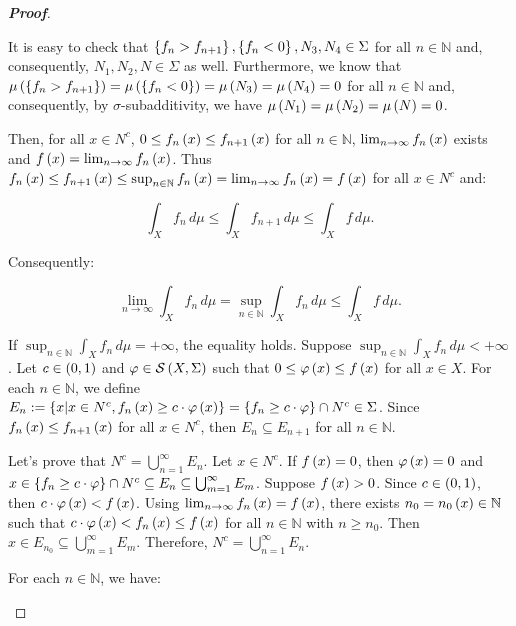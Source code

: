 \begin{theorem}
\begin{proof}[\rm\textbf{Proof}]
\begin{enumerate}
      It is easy to check that $\left\{f_n>f_{n+1}\right\},\left\{f_n<0\right\},N_3,N_4\in\Sigma$ for all $n\in\mathbb{N}$ and, consequently, $N_1,N_2,N\in\Sigma$ as well. Furthermore, we know that $\mu\left(\left\{f_n>f_{n+1}\right\}\right)=\mu\left(\left\{f_n<0\right\}\right)=\mu\left(N_3\right)=\mu\left(N_4\right)=0$ for all $n\in\mathbb{N}$ and, consequently, by $\sigma$-subadditivity, we have $\mu\left(N_1\right)=\mu\left(N_2\right)=\mu\left(N\right)=0$.

      Then, for all $x\in N^c$, $0\leq f_n\left(x\right)\leq f_{n+1}\left(x\right)$ for all $n\in\mathbb{N}$, $\lim_{n\to\infty}{f_n\left(x\right)}$ exists and $f\left(x\right)=\lim_{n\to\infty}{f_n\left(x\right)}$. Thus $f_n\left(x\right)\leq f_{n+1}\left(x\right)\leq\sup_{n\in\mathbb{N}}{f_n\left(x\right)}=\lim_{n\to\infty}{f_n\left(x\right)}=f\left(x\right)$ for all $x\in N^c$ and:

      \begin{equation}
        \int_{X}{f_n\,d\mu}\leq\int_{X}{f_{n+1}\,d\mu}\leq\int_{X}{f\,d\mu}.
      \end{equation}

      Consequently:

      \begin{equation}
        \lim_{n\to\infty}{\int_{X}{f_n\,d\mu}}=\sup_{n\in\mathbb{N}}{\int_{X}{f_n\,d\mu}}\leq\int_{X}{f\,d\mu}.
      \end{equation}

      If $\sup_{n\in\mathbb{N}}{\int_{X}{f_n\,d\mu}}=+\infty$, the equality holds. Suppose $\sup_{n\in\mathbb{N}}{\int_{X}{f_n\,d\mu}}<+\infty$. Let $c\in\left(0,1\right)$ and $\varphi\in\mathcal{S}\left(X,\Sigma\right)$ such that $0\leq\varphi\left(x\right)\leq f\left(x\right)$ for all $x\in X$. For each $n\in\mathbb{N}$, we define $E_n:=\left\{x\middle|x\in N^c,f_n\left(x\right)\geq c\cdot\varphi\left(x\right)\right\}=\left\{f_n\geq c\cdot\varphi\right\}\cap N^c\in\Sigma$. Since $f_n\left(x\right)\leq f_{n+1}\left(x\right)$ for all $x\in N^c$, then $E_n\subseteq E_{n+1}$ for all $n\in\mathbb{N}$. 

      Let's prove that $N^c=\bigcup_{n=1}^{\infty}{E_n}$. Let $x\in N^c$. If $f\left(x\right)=0$, then $\varphi\left(x\right)=0$ and $x\in\left\{f_n\geq c\cdot\varphi\right\}\cap N^c\subseteq E_n\subseteq\bigcup_{m=1}^{\infty}{E_m}$. Suppose $f\left(x\right)>0$. Since $c\in\left(0,1\right)$, then $c\cdot\varphi\left(x\right)<f\left(x\right)$. Using $\lim_{n\to\infty}{f_n\left(x\right)}=f\left(x\right)$, there exists $n_0=n_0\left(x\right)\in\mathbb{N}$ such that $c\cdot\varphi\left(x\right)<f_n\left(x\right)\leq f\left(x\right)$ for all $n\in\mathbb{N}$ with $n\geq n_0$. Then $x\in E_{n_0}\subseteq\bigcup_{m=1}^{\infty}{E_m}$. Therefore, $N^c=\bigcup_{n=1}^{\infty}{E_n}$.

      For each $n\in\mathbb{N}$, we have:


\end{enumerate}
\end{proof}
\end{theorem}

